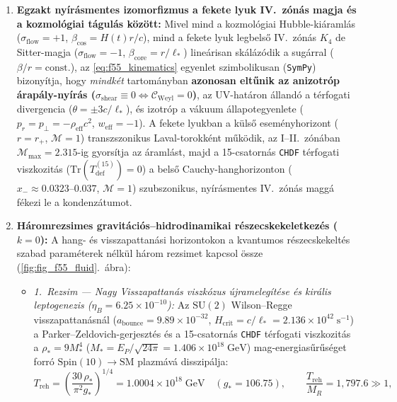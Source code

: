 \documentclass[11pt,a4paper]{article}
\theoremstyle{remark}
\begin{document}
\begin{enumerate}
  \item \textbf{Egzakt ny\'ir\'asmentes izomorfizmus a fekete lyuk IV.\ z\'on\'as magja \'es a kozmol\'ogiai t\'agul\'as k\"oz\"ott:} Mivel mind a kozmol\'ogiai Hubble-ki\'araml\'as ($\sigma_{\mathrm{flow}} = +1$, $\beta_{\mathrm{cos}} = H(t)r/c$), mind a fekete lyuk legbels\H{o} IV.\ z\'on\'as $K_4$ de Sitter-magja ($\sigma_{\mathrm{flow}} = -1$, $\beta_{\mathrm{core}} = r/\ell_*$) line\'arisan sk\'al\'az\'odik a sug\'arral ($\beta/r = \mathrm{const.}$), az \eqref{eq:f55_kinematics} egyenlet szimbolikusan (\texttt{SymPy}) bizony\'itja, hogy \emph{mindk\'et} tartom\'anyban \textbf{azonosan elt\H{u}nik az anizotr\'op \'arap\'aly-ny\'ir\'as ($\sigma_{\mathrm{shear}} \equiv 0 \iff \mathcal{C}_{\mathrm{Weyl}} = 0$)}, az UV-hat\'aron \'alland\'o a t\'erfogati divergencia ($\theta = \pm 3c/\ell_*$), \'es izotr\'op a v\'akuum \'allapotegyenlete ($p_r = p_\perp = -\rho_{\mathrm{eff}}c^2$, $w_{\mathrm{eff}} = -1$). A fekete lyukban a k\"uls\H{o} esem\'enyhorizont ($r = r_+$, $\mathcal{M} = 1$) transzszonikus Laval-torokk\'ent m\H{u}k\"odik, az I--II.\ z\'on\'aban $\mathcal{M}_{\max} = 2.315$-ig gyors\'itja az \'araml\'ast, majd a 15-csatorn\'as \texttt{CHDF} t\'erfogati viszkozit\'as ($\mathrm{Tr}(T_{\mathrm{def}}^{(15)}) = 0$) a bels\H{o} Cauchy-hanghorizonton ($x_- \approx 0.0323\text{--}0.037$, $\mathcal{M} = 1$) szubszonikus, ny\'ir\'asmentes IV.\ z\'on\'as magg\'a f\'ekezi le a kondenz\'atumot.
  \item \textbf{H\'aromrezsimes gravit\'aci\'os--hidrodinamikai r\'eszecskekeletkez\'es ($k = 0$):} A hang- \'es visszapattan\'asi horizontokon a kvantumos r\'eszecskekelt\'es szabad param\'eterek n\'elk\"ul h\'arom rezsimet kapcsol \"ossze (\ref{fig:fig_f55_fluid}.\ \'abra):
  \begin{itemize}
    \item \emph{1.\ Rezsim --- Nagy Visszapattan\'as viszk\'ozus \'ujrameleg\'it\'ese \'es kir\'alis leptogenezis ($\eta_B = 6.25\times 10^{-10}$):} Az $\mathrm{SU}(2)$ Wilson--Regge visszapattan\'asn\'al ($a_{\mathrm{bounce}} = 9.89\times 10^{-32}$, $H_{\mathrm{crit}} = c/\ell_* = 2.136\times 10^{42}\;\mathrm{s}^{-1}$) a Parker--Zeldovich-gerjeszt\'es \'es a 15-csatorn\'as \texttt{CHDF} t\'erfogati viszkozit\'as a $\rho_* = 9M_*^4$ ($M_* = E_P/\sqrt{24\pi} = 1.406\times 10^{18}\;\mathrm{GeV}$) mag-energias\H{u}r\H{u}s\'eget forr\'o $\mathrm{Spin}(10)\to\mathrm{SM}$ plazm\'av\'a disszip\'alja:
    \begin{equation}
      T_{\mathrm{reh}} = \left(\frac{30\,\rho_*}{\pi^2 g_*}\right)^{1/4} = 1.0004 \times 10^{18}\;\mathrm{GeV} \quad (g_* = 106.75), \qquad \frac{T_{\mathrm{reh}}}{M_R} = 1{,}797.6 \gg 1,

\end{equation}
\end{itemize}
\end{enumerate}
\end{document}
